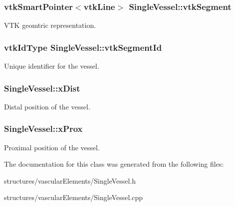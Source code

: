 \subsubsection[{\texorpdfstring{vtk\+Segment}{vtkSegment}}]{\setlength{\rightskip}{0pt plus 5cm}vtk\+Smart\+Pointer$<$vtk\+Line$>$ Single\+Vessel\+::vtk\+Segment}\hypertarget{class_single_vessel_af37e0b95e68662ded08ef7037b64b7e4}{}\label{class_single_vessel_af37e0b95e68662ded08ef7037b64b7e4}
V\+TK geomtric representation. 
\subsubsection[{\texorpdfstring{vtk\+Segment\+Id}{vtkSegmentId}}]{\setlength{\rightskip}{0pt plus 5cm}vtk\+Id\+Type Single\+Vessel\+::vtk\+Segment\+Id}\hypertarget{class_single_vessel_aa283409729185f57950d58a483b7d661}{}\label{class_single_vessel_aa283409729185f57950d58a483b7d661}
Unique identifier for the vessel. 
\subsubsection[{\texorpdfstring{x\+Dist}{xDist}}]{ Single\+Vessel\+::x\+Dist}\hypertarget{class_single_vessel_aff9be7494294fb039b2aa284eb39c171}{}\label{class_single_vessel_aff9be7494294fb039b2aa284eb39c171}
Distal position of the vessel. 
\subsubsection[{\texorpdfstring{x\+Prox}{xProx}}]{ Single\+Vessel\+::x\+Prox}\hypertarget{class_single_vessel_a22d0c3617e92838a3a45310b9cbe7f91}{}\label{class_single_vessel_a22d0c3617e92838a3a45310b9cbe7f91}
Proximal position of the vessel. 

The documentation for this class was generated from the following files\+:\begin{DoxyCompactItemize}
\item 
structures/vascular\+Elements/Single\+Vessel.\+h\item 
structures/vascular\+Elements/Single\+Vessel.\+cpp\end{DoxyCompactItemize}
